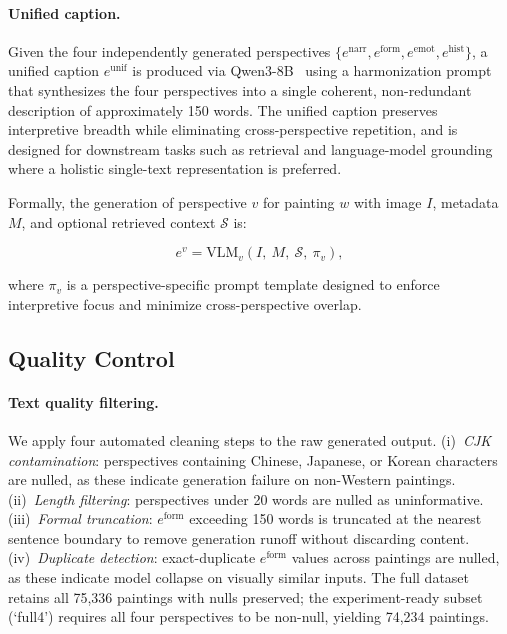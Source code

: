 \paragraph{Unified caption.}
Given the four independently generated perspectives $\{e^{\text{narr}}, e^{\text{form}}, e^{\text{emot}}, e^{\text{hist}}\}$, a unified caption $e^{\text{unif}}$ is produced via Qwen3-8B~\cite{bai2025qwen3vltechnicalreport} using a harmonization prompt that synthesizes the four perspectives into a single coherent, non-redundant description of approximately 150 words.
The unified caption preserves interpretive breadth while eliminating cross-perspective repetition, and is designed for downstream tasks such as retrieval and language-model grounding where a holistic single-text representation is preferred.

Formally, the generation of perspective $v$ for painting $w$ with image $I$, metadata $M$, and optional retrieved context $\mathcal{S}$ is:

\begin{equation}
e^{v} = \text{VLM}_v\!\left(I,\ M,\ \mathcal{S},\ \pi_v\right),
\end{equation}

where $\pi_v$ is a perspective-specific prompt template designed to enforce interpretive focus and minimize cross-perspective overlap.

\subsection{Quality Control}

\paragraph{Text quality filtering.}
We apply four automated cleaning steps to the raw generated output.
(i)~\textit{CJK contamination}: perspectives containing Chinese, Japanese, or Korean characters are nulled, as these indicate generation failure on non-Western paintings.
(ii)~\textit{Length filtering}: perspectives under 20 words are nulled as uninformative.
(iii)~\textit{Formal truncation}: $e^{\text{form}}$ exceeding 150 words is truncated at the nearest sentence boundary to remove generation runoff without discarding content.
(iv)~\textit{Duplicate detection}: exact-duplicate $e^{\text{form}}$ values across paintings are nulled, as these indicate model collapse on visually similar inputs.
The full dataset retains all 75,336 paintings with nulls preserved; the experiment-ready subset (`full4') requires all four perspectives to be non-null, yielding 74,234 paintings.

